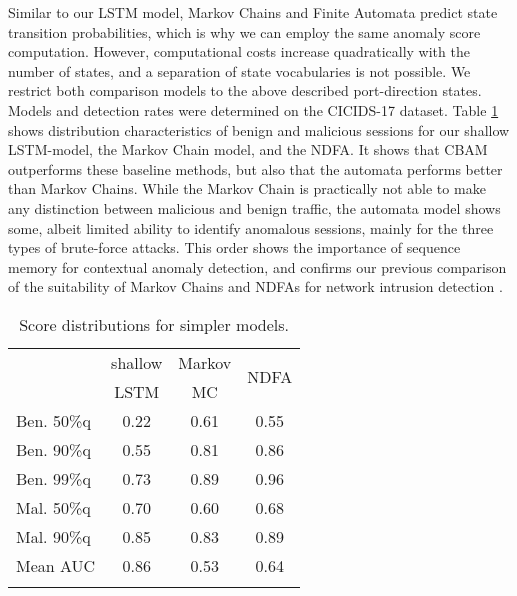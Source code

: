 Similar to our LSTM model, Markov Chains and Finite Automata predict state transition probabilities, which is why we can employ the same anomaly score computation. However, computational costs increase quadratically with the number of states, and a separation of state vocabularies is not possible. We restrict both comparison models to the above described port-direction states. 
Models and detection rates were determined on the CICIDS-17 dataset.
%
Table \ref{tabF:Simpcomptab} shows distribution characteristics of benign and malicious sessions for our shallow LSTM-model, the Markov Chain model, and the NDFA. It shows that CBAM outperforms these baseline methods, but also that the automata performs better than Markov Chains. While the Markov Chain is practically not able to make any distinction between malicious and benign traffic, the automata model shows some, albeit limited ability to identify anomalous sessions, mainly for the three types of brute-force attacks. This order shows the importance of sequence memory for contextual anomaly detection, and confirms our previous comparison of the suitability of Markov Chains and NDFAs for network intrusion detection \cite{grov2019towards}.
\begin{table}[ht]
\centering
\begin{tabular}{l|ccc}
\hline
&shallow&Markov&\multirow{2}{*}{NDFA}\\
&LSTM&MC&\\
\hline
Ben. 50\%q&0.22&0.61&0.55\\[0.2cm]
Ben. 90\%q&0.55&0.81&0.86\\[0.2cm]
Ben. 99\%q&0.73&0.89&0.96\\[0.2cm]
Mal. 50\%q&0.70&0.60&0.68\\[0.2cm]
Mal. 90\%q&0.85&0.83&0.89\\[0.2cm]
Mean AUC&0.86&0.53&0.64\\ \hline
\multicolumn{2}{c}{ }
\end{tabular}
\caption{Score distributions for simpler models.}\label{tabF:Simpcomptab}
\end{table}


